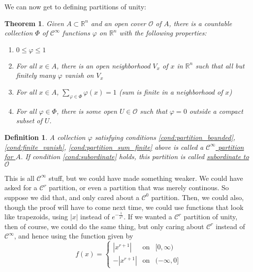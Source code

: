 \documentclass{article}
\newtheorem{theorem}{Theorem}
\newtheorem{definition}{Definition}
\newcommand{\reals}[0]{\mathbb{R}}
\newcommand{\mc}[1]{\mathcal{#1}}
\begin{document}
We can now get to defining partitions of unity:
\begin{theorem}
  Given \(A \subset \reals^n\) and an open cover \(\mc{O}\) of \(A\), there is a countable collection \(\Phi\) of \(\mc{C}^\infty\) functions \(\varphi\) on \(\reals^n\) with the following properties:
  \begin{enumerate}

    \item \(0 \leq \varphi \leq 1\) \label{cond:partition_bounded}

    \item For all \(x \in A\), there is an open neighborhood \(V_x\) of \(x\) in \(\reals^n\) such that all but finitely many \(\varphi\) vanish on \(V_x\) \label{cond:finite_vanish}

    \item For all \(x \in A\), \(\sum_{\varphi \in \Phi}\varphi(x) = 1\) (sum is finite in a neighborhood of \(x\)) \label{cond:partition_sum_finite}

    \item For all \(\varphi \in \Phi\), there is some open \(U \in \mc{O}\) such that \(\varphi = 0\) outside a compact subset of \(U\). \label{cond:subordinate}

  \end{enumerate}

  \label{cheapway}
\end{theorem}
\begin{definition}
  A collection \(\varphi\) satisfying conditions
  \ref{cond:partition_bounded},
  \ref{cond:finite_vanish},
  \ref{cond:partition_sum_finite}
  above is called a \underline{\(\mc{C}^\infty\) partition for \(A\)}.
  If condition \ref{cond:subordinate} holds, this partition is called \underline{subordinate to \(\mc{O}\)}
\end{definition}
This is all \(\mc{C}^\infty\) stuff, but we could have made something weaker. We could have asked for a \(\mc{C}^r\) partition, or even a partition that was merely continous. So suppose we did that, and only cared about a \(\mc{C}^0\) partition. Then, we could also, though the proof will have to come next time, we could use functions that look like trapezoids, using \(|x|\) instead of \(e^{-\frac{1}{x^2}}\). If we wanted a \(\mc{C}^r\) partition of unity, then of course, we could do the same thing, but only caring about \(\mc{C}^r\) instead of \(\mc{C}^\infty\), and hence using the function given by
\begin{equation}
  f(x) = \left\{\begin{array}{ccc}
    |x^{r + 1}| & \text{on} & [0, \infty) \\
    -|x^{r + 1}| & \text{on} & (-\infty, 0]
  \end{array}\right.
\end{equation}
\end{document}
